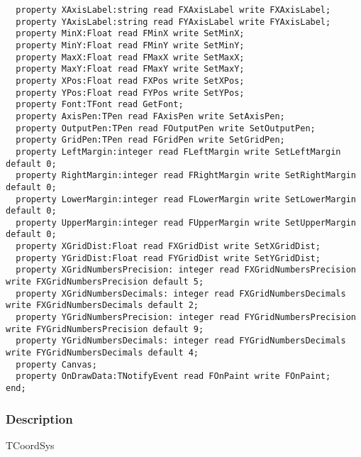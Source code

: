 \documentclass[12pt,a4paper,oneside]{report}
\begin{document}
\begin{verbatim}
  property XAxisLabel:string read FXAxisLabel write FXAxisLabel;
  property YAxisLabel:string read FYAxisLabel write FYAxisLabel;
  property MinX:Float read FMinX write SetMinX; 
  property MinY:Float read FMinY write SetMinY;
  property MaxX:Float read FMaxX write SetMaxX;
  property MaxY:Float read FMaxY write SetMaxY;
  property XPos:Float read FXPos write SetXPos;
  property YPos:Float read FYPos write SetYPos;
  property Font:TFont read GetFont;
  property AxisPen:TPen read FAxisPen write SetAxisPen;
  property OutputPen:TPen read FOutputPen write SetOutputPen;
  property GridPen:TPen read FGridPen write SetGridPen;
  property LeftMargin:integer read FLeftMargin write SetLeftMargin default 0;
  property RightMargin:integer read FRightMargin write SetRightMargin default 0;
  property LowerMargin:integer read FLowerMargin write SetLowerMargin default 0;
  property UpperMargin:integer read FUpperMargin write SetUpperMargin default 0;
  property XGridDist:Float read FXGridDist write SetXGridDist;
  property YGridDist:Float read FYGridDist write SetYGridDist;
  property XGridNumbersPrecision: integer read FXGridNumbersPrecision write FXGridNumbersPrecision default 5;
  property XGridNumbersDecimals: integer read FXGridNumbersDecimals write FXGridNumbersDecimals default 2;
  property YGridNumbersPrecision: integer read FYGridNumbersPrecision write FYGridNumbersPrecision default 9;
  property YGridNumbersDecimals: integer read FYGridNumbersDecimals write FYGridNumbersDecimals default 4;
  property Canvas;
  property OnDrawData:TNotifyEvent read FOnPaint write FOnPaint;
end;
\end{verbatim}
\subsubsection{Description}
TCoordSys
\end{document}
